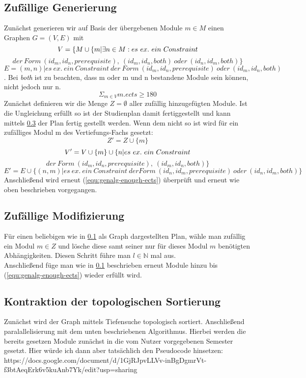 \documentclass[titlepage=true, parskip=full]{scrartcl}
\begin{document}
	\subsection{Zufällige Generierung}
	\label{subsec:genalg-random-generation}
	Zunächst generieren wir auf Basis der übergebenen Module $m \in M$ einen Graphen $G = (V, E)$ mit
	\[V = \{M \cup \{m | \exists n \in M: es\ ex.\ ein\ Constraint\\\] \[ der\ Form\ (id_m, id_n, prerequisite),\ (id_m, id_n, both)\ oder\ (id_n, id_m, both) \}\]
	\[E = { (m, n) | es\ ex.\ ein\ Constraint\ der\ Form\ (id_m, id_n, prerequisite)\ oder\ (id_m, id_n, both)}\].
	Bei \textit{both} ist zu beachten, dass m oder m und n bestandene Module sein können, nicht jedoch nur n.
	\begin{equation}
	\Sigma_{m\in V}m.ects \ge 180
	\label{equ:genalg-enough-ects}
	\end{equation}
	Zunächst definieren wir die Menge $Z=\emptyset$ aller zufällig hinzugefügten Module.
	Ist die Ungleichung erfüllt so ist der Studienplan damit fertiggestellt und kann mittels \ref{subsec:genalg-contract-topolog-sort} der Plan fertig gestellt werden.
	Wenn dem nicht so ist wird für ein zufälliges Modul m des Vertiefungs-Fachs gesetzt:
	\[Z' = Z \cup \{m\}\]
	\[V' = V \cup \{m\} \cup \{n | es\ ex.\ ein\ Constraint\\\]\[der\ Form\ (id_m, id_n, prerequisite),\ (id_m, id_n, both)\}
	\]
	\[E' = E \cup \{ (n, m) | es\ ex.\ ein\ Constraint\ der Form\ (id_n, id_m, prerequisite)\ oder\ (id_n, id_m, both)\}\]
	Anschließend wird erneut (\ref{equ:genalg-enough-ects}) überprüft und erneut wie oben beschrieben vorgegangen.
	\subsection{Zufällige Modifizierung}
	\label{subsec:genalg-random-modification}
	Für einen beliebigen wie in \ref{subsec:genalg-random-generation} als Graph dargestellten Plan, wähle man zufällig ein Modul $m \in Z$ und lösche diese samt seiner nur für dieses Modul $m$ benötigten Abhängigkeiten. Diesen Schritt führe man $l \in \mathbb{N}$ mal aus.\\
	Anschließend füge man wie in \ref{subsec:genalg-random-generation} beschrieben erneut Module hinzu bis (\ref{equ:genalg-enough-ects}) wieder erfüllt wird.
	
	\subsection{Kontraktion der topologischen Sortierung}
	\label{subsec:genalg-contract-topolog-sort}
	Zunächst wird der Graph mittels Tiefensuche topologisch sortiert.
	Anschließend paralallelisierung mit dem unten beschriebenen Algorithmus.
	Hierbei werden die bereits gesetzen Module zunächst in die vom Nutzer vorgegebenen Semester gesetzt.
	Hier würde ich dann aber tatsächlich den Pseudocode hinsetzen:
	https://docs.google.com/document/d/1GjRJpvLLVv-inBgDgmrVt-f3btAeqErk6v5kuAnb7Yk/edit?usp=sharing
	
\end{document}
